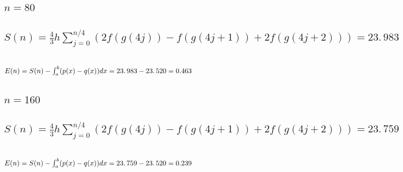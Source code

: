 \documentclass{article}
\begin{document}
\bigskip 

\subsection{$n=80$}

\subsection{$S(n)=\frac{4}{3}h\sum%
\limits_{j=0}^{n/4}(2f(g(4j))-f(g(4j+1))+2f(g(4j+2)))=23.\,\allowbreak 983$}

\subsection{\protect\bigskip $E(n)=S(n)-\protect\int_{a}^{b}(p(x)-q(x))dx%
\allowbreak =23.\,\allowbreak 983-23.\,\allowbreak 520=\allowbreak 0.463\,$}

\bigskip 

\subsection{$n=160$}

\subsection{$S(n)=\frac{4}{3}h\sum%
\limits_{j=0}^{n/4}(2f(g(4j))-f(g(4j+1))+2f(g(4j+2)))=23.\,\allowbreak 759$}

\subsection{$E(n)=S(n)-\protect\int_{a}^{b}(p(x)-q(x))dx\allowbreak
=23.\,\allowbreak 759-23.\,\allowbreak 520=\allowbreak 0.239$}
\end{document}
